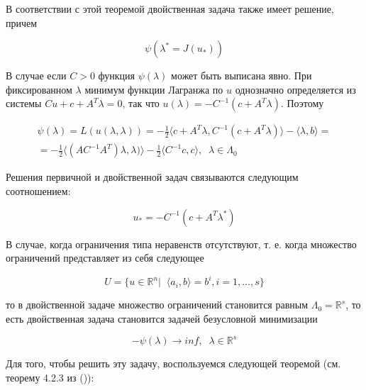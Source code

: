 \documentclass[a4paper, 12pt, titlepage]{article}
\theoremstyle{definition}
\theoremstyle{plain}
\theoremstyle{plain}
\begin{document}
В соответствии с этой теоремой двойственная задача также имеет решение, причем

\begin{equation}
 \psi(\lambda^{*} = J(u_{*}))
\end{equation}

В случае если $C > 0$ функция $\psi(\lambda)$ может быть выписана явно. При
фиксированном $\lambda$ минимум функции Лагранжа по $u$ однозначно определяется
из системы $C u + c + A^{T} \lambda = 0$, так что
$u(\lambda) = - C^{-1} (c + A^{T} \lambda)$. Поэтому

\begin{equation}
 \begin{aligned}
  \psi(\lambda) = L(u(\lambda, \lambda)) =
  - \frac{1}{2} \langle c + A^{T} \lambda, C^{-1} (c + A^{T} \lambda) \rangle -
  \langle \lambda, b \rangle = \\
  = - \frac{1}{2} \langle (A C^{-1} A^{T}) \lambda, \lambda) \rangle
  - \frac{1}{2} \langle C^{-1} c, c \rangle, \;\; \lambda \in \Lambda_{0}
 \end{aligned}
\end{equation}

Решения первичной и двойственной задач связываются следующим соотношением:

\begin{equation}
 u_{*} = - C^{-1} (c + A^{T} \lambda^{*})
\end{equation}


В случае, когда ограничения типа неравенств отсутствуют, т. е. когда множество
ограничений представляет из себя следующее

\begin{equation}
 U = \{u \in \mathbb{R}^{n} | \;\; \langle a_{i}, b \rangle = b^{i},
 i = 1, \ldots, s\}
\end{equation}

то в двойственной задаче множество ограничений становится равным $\Lambda_{0} = 
\mathbb{R}^{s}$, то есть двойственная задача становится задачей безусловной 
минимизации

\begin{equation}
 - \psi (\lambda) \to inf, \;\; \lambda \in \mathbb{R}^{s}
\end{equation}

Для того, чтобы решить эту задачу, воспользуемся следующей теоремой (см. 
теорему 4.2.3 из (\cite{Vasilev1980})):
\end{document}
